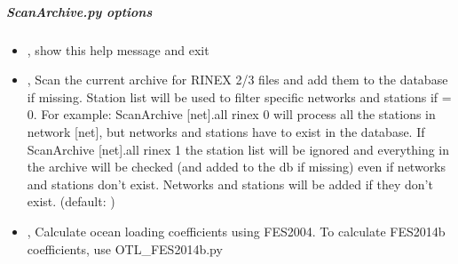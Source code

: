 \documentclass[letterpaper,10pt,english]{sphinxmanual}
\begin{document}
\subparagraph{ScanArchive.py options}
\label{\detokenize{pgamit.com:ScanArchive.py-options}}\begin{itemize}
\item {} 
\sphinxAtStartPar
{\hyperref[\detokenize{pgamit.com:ScanArchive.py--h}]{}}, {\hyperref[\detokenize{pgamit.com:ScanArchive.py---help}]{}} \sphinxhyphen{} show this help message and exit

\item {} 
\sphinxAtStartPar
{\hyperref[\detokenize{pgamit.com:ScanArchive.py--rinex}]{}} , {\hyperref[\detokenize{pgamit.com:ScanArchive.py---rinex}]{}}  \sphinxhyphen{} Scan the current archive for RINEX 2/3 files and add them to the database if missing. Station list will be used to filter specific networks and stations if  = 0. For example: ScanArchive {[}net{]}.all \sphinxhyphen{}rinex 0 will process all the stations in network {[}net{]}, but networks and stations have to exist in the database. If ScanArchive {[}net{]}.all \sphinxhyphen{}rinex 1 the station list will be ignored and everything in the archive will be checked (and added to the db if missing) even if networks and stations don\textasciigrave{}\textasciigrave{}’t exist. Networks and stations will be added if they don’{\color{red}\bfseries{}\textasciigrave{}\textasciigrave{}}t exist. (default: )

\item {} 
\sphinxAtStartPar
{\hyperref[\detokenize{pgamit.com:ScanArchive.py--otl}]{}}, {\hyperref[\detokenize{pgamit.com:ScanArchive.py---ocean_loading}]{}} \sphinxhyphen{} Calculate ocean loading coefficients using FES2004. To calculate FES2014b coefficients, use OTL\_FES2014b.py


\end{itemize}
\end{document}
